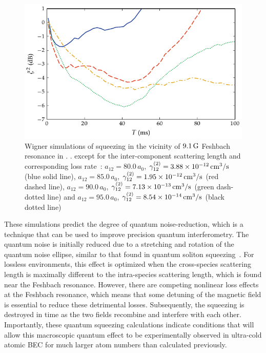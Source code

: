 \begin{figure}
    \centerline{\includegraphics{figures_generated/bec_squeezing/feshbach_squeezing.pdf}}

    \caption{
    Wigner simulations of squeezing in the vicinity of $9.1\mbox{\ensuremath{\,\mathrm{G}}}$ Feshbach resonance in \Rb.
    .
    except for the inter-component scattering length and corresponding loss rate~\cite{Kaufman2009}:
    $a_{12} = 80.0\,a_0$, $\gamma^{(2)}_{12} = 3.88 \times 10^{-12}\mbox{\ensuremath{\,\mathrm{cm^3/s}}}$ (blue solid line),
    $a_{12} = 85.0\,a_0$, $\gamma^{(2)}_{12} = 1.95 \times 10^{-12}\mbox{\ensuremath{\,\mathrm{cm^3/s}}}$ (red dashed line),
    $a_{12} = 90.0\,a_0$, $\gamma^{(2)}_{12} = 7.13 \times 10^{-13}\mbox{\ensuremath{\,\mathrm{cm^3/s}}}$ (green dash-dotted line) and
    $a_{12} = 95.0\,a_0$, $\gamma^{(2)}_{12} = 8.54 \times 10^{-14}\mbox{\ensuremath{\,\mathrm{cm^3/s}}}$ (black dotted line)}

    \label{fig:bec-squeezing:feshbach:squeezing}
\end{figure}


These simulations predict the degree of quantum noise-reduction, which is a technique that can be used to improve precision quantum interferometry.
The quantum noise is initially reduced due to a stretching and rotation of the quantum noise ellipse, similar to that found in quantum soliton squeezing~\cite{Carter1987,Drummond1993a}.
For lossless environments, this effect is optimized when the cross-species scattering length is maximally different to the intra-species scattering length, which is found near the Feshbach resonance.
However, there are competing nonlinear loss effects at the Feshbach resonance, which means that some detuning of the magnetic field is essential to reduce these detrimental losses.
Subsequently, the squeezing is destroyed in time as the two fields recombine and interfere with each other.
Importantly, these quantum squeezing calculations indicate conditions that will allow this macroscopic quantum effect to be experimentally observed in ultra-cold atomic BEC for much larger atom numbers than calculated previously.

